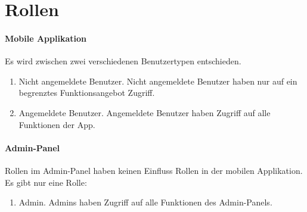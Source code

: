 \section{Rollen}

\paragraph{Mobile Applikation}
Es wird zwischen zwei verschiedenen Benutzertypen entschieden.
\begin{enumerate}
    \item Nicht angemeldete Benutzer. Nicht angemeldete Benutzer haben nur auf ein begrenztes Funktionsangebot Zugriff.
    \item Angemeldete Benutzer. Angemeldete Benutzer haben Zugriff auf alle Funktionen der App.
\end{enumerate}

\paragraph{Admin-Panel}
Rollen im Admin-Panel haben keinen Einfluss Rollen in der mobilen Applikation.
Es gibt nur eine Rolle:
\begin{enumerate}
    \item Admin. Admins haben Zugriff auf alle Funktionen des Admin-Panels.
\end{enumerate}
